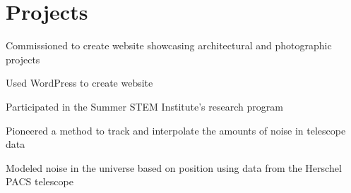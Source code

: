\documentclass[]{deedy-resume-openfont}
\begin{document}
\begin{minipage}[t]{0.66\textwidth}

\section{Projects}
\begin{tightemize}
\item Commissioned to create website showcasing architectural and photographic projects
\item Used WordPress to create website
\end{tightemize}
\sectionsep

\begin{tightemize}
\item Participated in the Summer STEM Institute's research program
\item Pioneered a method to track and interpolate the amounts of noise in telescope data
\item Modeled noise in the universe based on position using data from the Herschel PACS telescope
\end{tightemize}
\sectionsep


%
%


\end{minipage}%
\hfill
\end{document}
